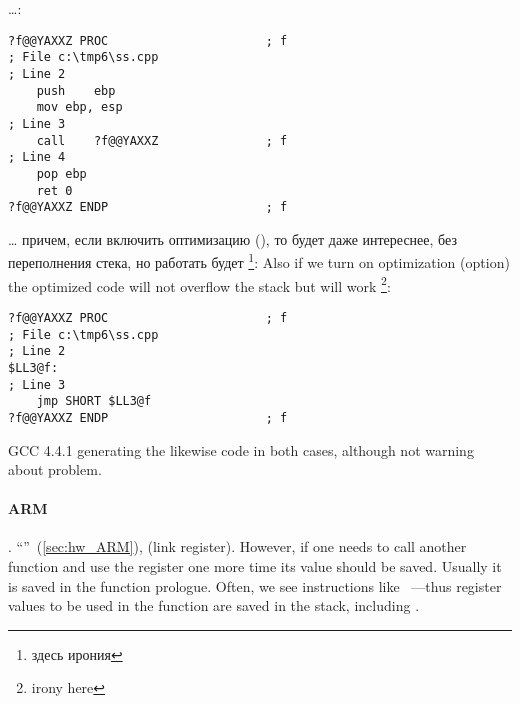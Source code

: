 \dots {}:

\begin{lstlisting}
?f@@YAXXZ PROC						; f
; File c:\tmp6\ss.cpp
; Line 2
	push	ebp
	mov	ebp, esp
; Line 3
	call	?f@@YAXXZ				; f
; Line 4
	pop	ebp
	ret	0
?f@@YAXXZ ENDP						; f
\end{lstlisting}

\dots \IFRU
{причем, если включить оптимизацию (\Ox), то будет даже интереснее, без переполнения стека, 
но работать будет \footnote{здесь ирония}:}
{Also if we turn on optimization (\Ox option) the optimized code will not overflow the stack 
but will work \footnote{irony here}:}

\begin{lstlisting}
?f@@YAXXZ PROC						; f
; File c:\tmp6\ss.cpp
; Line 2
$LL3@f:
; Line 3
	jmp	SHORT $LL3@f
?f@@YAXXZ ENDP						; f
\end{lstlisting}

{GCC 4.4.1 generating the likewise code in both cases, although not warning about problem.}

\paragraph{ARM}

.
 ``\HelloWorldSectionName''~(\ref{sec:hw_ARM}),
 \LR (\gls{link register}).
{However, if one needs to call another function and use the \LR register
one more time its value should be saved}.
{Usually it is saved in the function prologue. Often, we see instructions like}
 
{~---thus register values
to be used in the function are saved in the stack, including} \LR.

